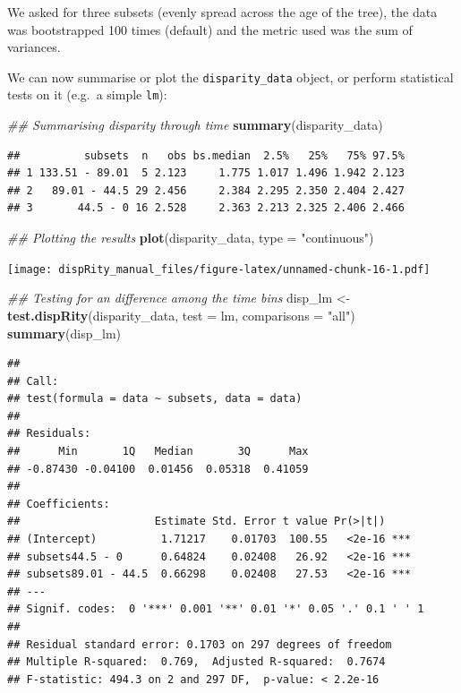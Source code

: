 \documentclass[]{book}
\newenvironment{Shaded}{\begin{snugshade}}{\end{snugshade}}
\newcommand{\CommentTok}[1]{\textcolor[rgb]{0.56,0.35,0.01}{\textit{#1}}}
\newcommand{\DataTypeTok}[1]{\textcolor[rgb]{0.13,0.29,0.53}{#1}}
\newcommand{\KeywordTok}[1]{\textcolor[rgb]{0.13,0.29,0.53}{\textbf{#1}}}
\newcommand{\NormalTok}[1]{#1}
\newcommand{\StringTok}[1]{\textcolor[rgb]{0.31,0.60,0.02}{#1}}
\begin{document}
We asked for three subsets (evenly spread across the age of the tree), the data was bootstrapped 100 times (default) and the metric used was the sum of variances.

We can now summarise or plot the \texttt{disparity\_data} object, or perform statistical tests on it (e.g.~a simple \texttt{lm}):

\begin{Shaded}
\begin{Highlighting}[]
\CommentTok{## Summarising disparity through time}
\KeywordTok{summary}\NormalTok{(disparity_data)}
\end{Highlighting}
\end{Shaded}

\begin{verbatim}
##          subsets  n   obs bs.median  2.5%   25%   75% 97.5%
## 1 133.51 - 89.01  5 2.123     1.775 1.017 1.496 1.942 2.123
## 2   89.01 - 44.5 29 2.456     2.384 2.295 2.350 2.404 2.427
## 3       44.5 - 0 16 2.528     2.363 2.213 2.325 2.406 2.466
\end{verbatim}

\begin{Shaded}
\begin{Highlighting}[]
\CommentTok{## Plotting the results}
\KeywordTok{plot}\NormalTok{(disparity_data, }\DataTypeTok{type =} \StringTok{"continuous"}\NormalTok{)}
\end{Highlighting}
\end{Shaded}

\texttt{[image: dispRity\_manual\_files/figure-latex/unnamed-chunk-16-1.pdf]}

\begin{Shaded}
\begin{Highlighting}[]
\CommentTok{## Testing for an difference among the time bins}
\NormalTok{disp_lm <-}\StringTok{ }\KeywordTok{test.dispRity}\NormalTok{(disparity_data, }\DataTypeTok{test =}\NormalTok{ lm,}
                         \DataTypeTok{comparisons =} \StringTok{"all"}\NormalTok{)}
\KeywordTok{summary}\NormalTok{(disp_lm)}
\end{Highlighting}
\end{Shaded}

\begin{verbatim}
## 
## Call:
## test(formula = data ~ subsets, data = data)
## 
## Residuals:
##      Min       1Q   Median       3Q      Max 
## -0.87430 -0.04100  0.01456  0.05318  0.41059 
## 
## Coefficients:
##                     Estimate Std. Error t value Pr(>|t|)    
## (Intercept)          1.71217    0.01703  100.55   <2e-16 ***
## subsets44.5 - 0      0.64824    0.02408   26.92   <2e-16 ***
## subsets89.01 - 44.5  0.66298    0.02408   27.53   <2e-16 ***
## ---
## Signif. codes:  0 '***' 0.001 '**' 0.01 '*' 0.05 '.' 0.1 ' ' 1
## 
## Residual standard error: 0.1703 on 297 degrees of freedom
## Multiple R-squared:  0.769,  Adjusted R-squared:  0.7674 
## F-statistic: 494.3 on 2 and 297 DF,  p-value: < 2.2e-16
\end{verbatim}
\end{document}
